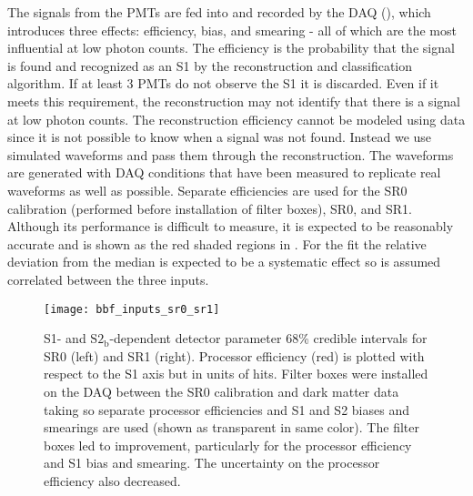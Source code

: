 The signals from the PMTs are fed into and recorded by the DAQ (), which introduces three effects:
efficiency, bias, and smearing - all of which are the most influential at low photon counts.  The efficiency is the probability that
the signal is found and recognized as an S1 by the reconstruction and
classification algorithm.  If at least 3 PMTs do not observe the S1 it is discarded.  Even if it meets this requirement, the
reconstruction
may not identify that there is a signal at low photon counts.  The reconstruction efficiency cannot be modeled using data since it is
not possible to know when a signal was not found.  Instead we use simulated waveforms and pass them through the reconstruction.  The
waveforms are generated with DAQ conditions that have been measured to replicate real waveforms as well as possible.  Separate
efficiencies are used for the SR0 \ambe calibration (performed before installation of filter boxes), SR0, and SR1.  Although its
performance is difficult to measure, it is expected to be reasonably accurate and is shown as the red shaded regions in
.  For the fit the relative deviation from the median is expected to be a
systematic effect so is assumed correlated between the three inputs.

\begin{figure}
\centering
\texttt{[image: bbf\_inputs\_sr0\_sr1]}
\caption{S1- and $\mathrm{S2_b}$-dependent detector parameter 68\% credible intervals for SR0 (left) and SR1 (right).  Processor
efficiency (red) is plotted with respect to the
S1 axis but in units of hits.  Filter boxes were installed on the DAQ between the SR0 \ambe calibration and
dark matter data taking so separate processor efficiencies and S1 and S2 biases and smearings are used (shown as transparent in same
color).  The filter boxes led to improvement, particularly for the processor efficiency and S1 bias and smearing.  The uncertainty on the
processor efficiency also decreased.}
\label{fig:er_nr_calibrations_parameter_determ_det_phys_inputs}
\end{figure}

